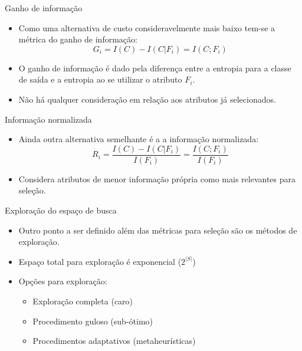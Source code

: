 \documentclass{beamer}
\begin{document}
\begin{frame}{Ganho de informação}
	\begin{itemize}
		\item Como uma alternativa de custo consideravelmente mais baixo tem-se a métrica do ganho de informação:
		$$G_i=I(C)-I(C|F_i)=I(C;F_i)$$

		\item O ganho de informação é dado pela diferença entre a entropia para a classe de saída e a entropia ao se utilizar o atributo $F_i$.
		\item Não há qualquer consideração em relação aos atributos já selecionados.

%		

	\end{itemize}
\end{frame}


\begin{frame}{Informação normalizada}
	\begin{itemize}
		\item Ainda outra alternativa semelhante é a a informação normalizada:
		$$R_i=\frac{I(C)-I(C|F_i)}{I(F_i)}=\frac{I(C;F_i)}{I(F_i)}$$

		\item Considera atributos de menor informação própria como mais relevantes para seleção.

%		

	\end{itemize}
\end{frame}


\begin{frame}{Exploração do espaço de busca}
	\begin{itemize}
		\item Outro ponto a ser definido além das métricas para seleção são os métodos de exploração.
		\item Espaço total para exploração é exponencial ($2^{|S|}$)
		\item Opções para exploração:
		\begin{itemize}
			\item Exploração completa (caro)
			\item Procedimento guloso (sub-ótimo)
			\item Procedimentos adaptativos (metaheurísticas)
		\end{itemize}
	\end{itemize}
\end{frame}
\end{document}
